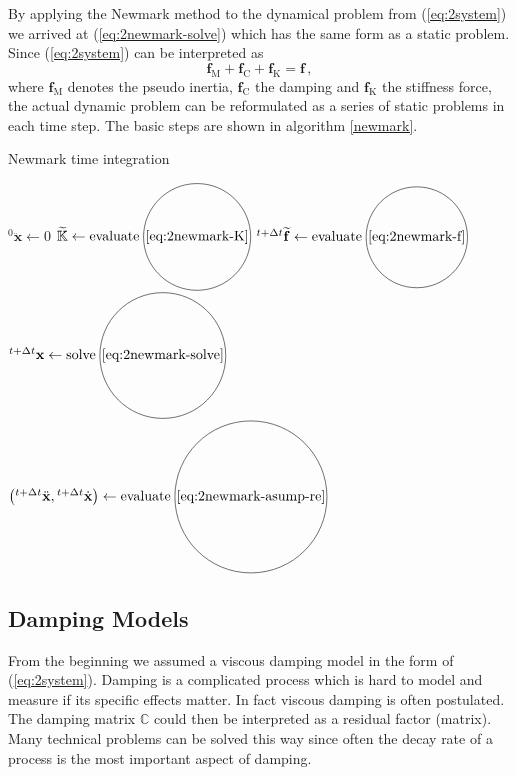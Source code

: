 \documentclass[conference]{journal}
\newcommand*\circled[1]{\tikz[baseline=(char.base)]{
   \node[shape=circle,draw,inner sep=1pt] (char) {#1};}}
\newcommand{\bb}[1]{\mathbb{#1}}
\newcommand{\B}[1]{\mathbf{#1}}
\newcommand{\Bx}{\B{x}}
\newcommand{\xtt}{{}^{t+\Delta t}\Bx}
\newcommand{\vtt}{{}^{t+\Delta t}\dot{\Bx}}
\newcommand{\att}{{}^{t+\Delta t}\ddot{\Bx}}
\newcommand{\M}{\bb{M}}
\newcommand{\C}{\bb{C}}
\newcommand{\K}{\bb{K}}
\begin{document}
	By applying the Newmark method to the dynamical problem from (\ref{eq:2system}) we arrived at (\ref{eq:2newmark-solve}) which has the same form as a static problem. Since (\ref{eq:2system}) can be interpreted as
	\begin{equation} \label{eq:2system-forces}
	\B{f}_\mathrm{M} + \B{f}_\mathrm{C} + \B{f}_\mathrm{K} = \B{f}\,,
	\end{equation}
	where $\B{f}_\mathrm{M}$ denotes the pseudo inertia, $\B{f}_\mathrm{C}$ the damping and $\B{f}_\mathrm{K}$ the stiffness force, the actual dynamic problem can be reformulated as a series of static problems in each time step. The basic steps are shown in algorithm \ref{newmark}.

	\begin{algorithm}
	\caption{Newmark time integration}\label{newmark}
	\begin{algorithmic}[1]
	\Procedure{Newmark}{$\M,\, \C,\, \K,\, \B{f}(t),\, \Delta t,\, t_\mathrm{end},\, {}^{0}\Bx,\, {}^{0}\dot{\Bx}$}
	\State ${}^{0}\ddot{\Bx} \gets 0$
	\State $\widetilde{\K} \gets \mathrm{evaluate} \; \circled{\ref{eq:2newmark-K}}$
		\State ${}^{t+\Delta t}\widetilde{\B{f}} \gets \mathrm{evaluate} \; \circled{\ref{eq:2newmark-f}}$
		\State $\xtt \gets \mathrm{solve} \; \circled{\ref{eq:2newmark-solve}}$
		\State $\left(\att,\vtt\right) \gets \mathrm{evaluate} \; \circled{\ref{eq:2newmark-asump-re}}$
	\EndFor
	\EndProcedure
	\end{algorithmic}
	\end{algorithm}

	\subsection{Damping Models}
	From the beginning we assumed a viscous damping model in the form of (\ref{eq:2system}). Damping is a complicated process which is hard to model and measure if its specific effects matter. In fact viscous damping is often postulated. The damping matrix $\C$ could then be interpreted as a residual factor (matrix). Many technical problems can be solved this way since often the decay rate of a process is the most important aspect of damping.
\end{document}
